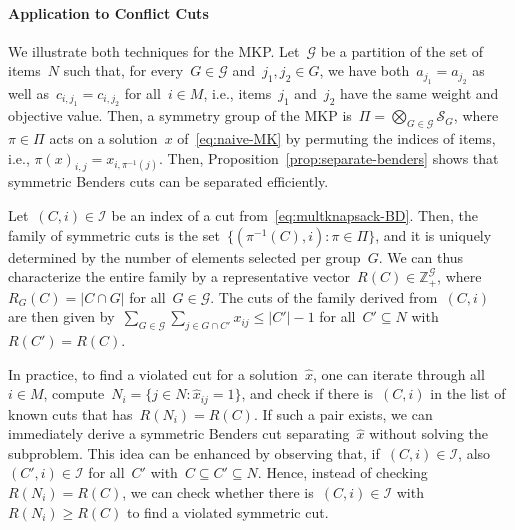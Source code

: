 \documentclass[a4paper,10pt]{article}
\newcommand{\Z}{\mathds{Z}}
\newcommand{\fixed}[1]{\hat{ #1 }}
\theoremstyle{definition}
\begin{document}
\paragraph{Application to Conflict Cuts}
We illustrate both techniques for the MKP.
Let~$\mathcal{G}$ be a partition of the set of items~$N$ such that, for every~$G \in \mathcal{G}$ and~$j_1,j_2 \in G$, we have both~$a_{j_1} = a_{j_2}$ as well as~$c_{i,j_1} = c_{i,j_2}$ for all~$i \in M$, i.e., items~$j_1$ and~$j_2$ have the same weight and objective value.
Then, a symmetry group of the MKP is~$\Pi = \bigotimes_{G\in \mathcal{G}} \mathcal{S}_{G}$, where~$\pi \in \Pi$ acts on a solution~$x$ of~\eqref{eq:naive-MK} by permuting the indices of items, i.e., $\pi(x)_{i,j} = x_{i,\pi^{-1}(j)}$.
Then, Proposition~\ref{prop:separate-benders} shows that symmetric Benders cuts can be separated efficiently.

Let~$(C,i) \in \mathcal{I}$ be an index of a cut from~\eqref{eq:multknapsack-BD}.
Then, the family of symmetric cuts is the set~$\{(\pi^{-1}(C),i) : \pi\in\Pi\}$, and it is uniquely determined by the number of elements selected per group~$G$.
We can thus characterize the entire family by a representative vector~$R(C) \in \Z_+^{\mathcal{G}}$, where~$R_G(C) = |C\cap G|$ for all~$G \in \mathcal{G}$.
The cuts of the family derived from~$(C,i)$ are then given by~$\sum_{G\in \mathcal{G}} \sum_{j\in G\cap C'} x_{ij} \leq |C'| - 1$ for all~$C' \subseteq N$ with~$R(C') = R(C)$.

In practice, to find a violated cut for a solution~$\fixed{x}$, one can iterate through all~$i \in M$, compute~$N_i = \{j \in N : \fixed{x}_{ij} = 1\}$, and check if there is~$(C,i)$ in the list of known cuts that has~$R(N_i) = R(C)$.
If such a pair exists, we can immediately derive a symmetric Benders cut separating~$\fixed{x}$ without solving the subproblem.
This idea can be enhanced by observing that, if~$(C,i) \in \mathcal{I}$, also~$(C',i) \in \mathcal{I}$ for all~$C'$ with~$C \subseteq C' \subseteq N$.
Hence, instead of checking~$R(N_i) = R(C)$, we can check whether there is~$(C,i) \in \mathcal{I}$ with~$R(N_i) \geq R(C)$ to find a violated symmetric cut.
\end{document}
